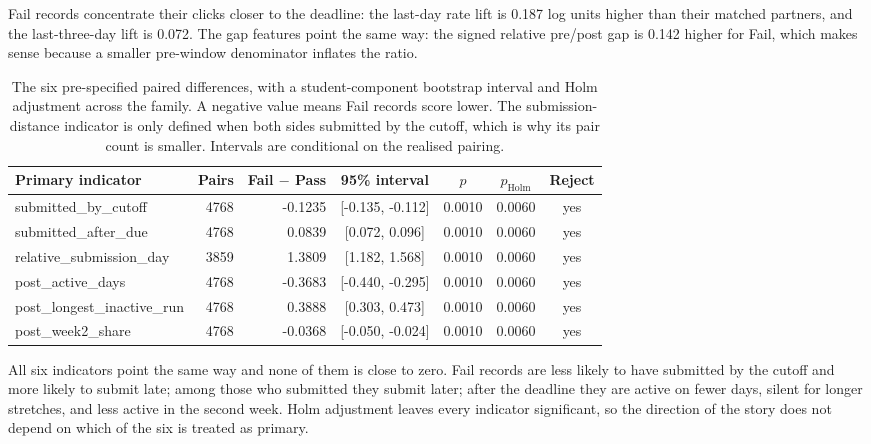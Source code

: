 \documentclass[11pt]{article}
\begin{document}
Fail records concentrate their clicks closer to the deadline: the last-day rate lift is 0.187 log units higher than their matched partners, and the last-three-day lift is 0.072. The gap features point the same way: the signed relative pre/post gap is 0.142 higher for Fail, which makes sense because a smaller pre-window denominator inflates the ratio.
\begin{table}[t]
\centering
\footnotesize
\begin{tabular}{lrrcccc}
\toprule
Primary indicator & Pairs & Fail $-$ Pass & 95\% interval & $p$ & $p_{\mathrm{Holm}}$ & Reject \\
\midrule
submitted\_by\_cutoff & 4768 & -0.1235 & [-0.135, -0.112] & 0.0010 & 0.0060 & yes \\
submitted\_after\_due & 4768 & 0.0839 & [0.072, 0.096] & 0.0010 & 0.0060 & yes \\
relative\_submission\_day & 3859 & 1.3809 & [1.182, 1.568] & 0.0010 & 0.0060 & yes \\
post\_active\_days & 4768 & -0.3683 & [-0.440, -0.295] & 0.0010 & 0.0060 & yes \\
post\_longest\_inactive\_run & 4768 & 0.3888 & [0.303, 0.473] & 0.0010 & 0.0060 & yes \\
post\_week2\_share & 4768 & -0.0368 & [-0.050, -0.024] & 0.0010 & 0.0060 & yes \\
\bottomrule
\end{tabular}
\caption{The six pre-specified paired differences, with a student-component bootstrap interval and Holm adjustment across the family. A negative value means Fail records score lower. The submission-distance indicator is only defined when both sides submitted by the cutoff, which is why its pair count is smaller. Intervals are conditional on the realised pairing.}
\label{tab:primary}
\end{table}
All six indicators point the same way and none of them is close to zero. Fail records are less likely to have submitted by the cutoff and more likely to submit late; among those who submitted they submit later; after the deadline they are active on fewer days, silent for longer stretches, and less active in the second week. Holm adjustment leaves every indicator significant, so the direction of the story does not depend on which of the six is treated as primary.
\end{document}
